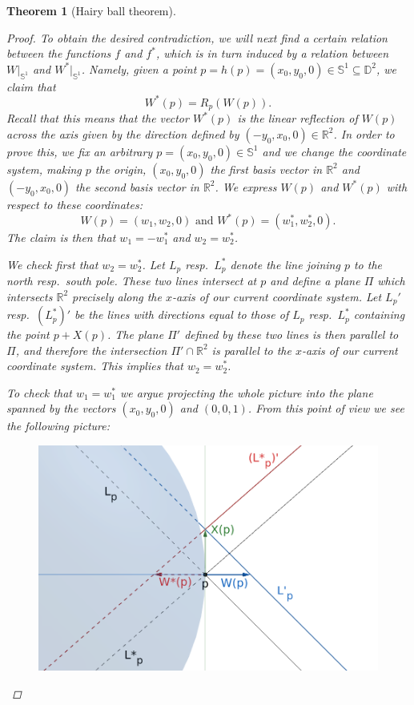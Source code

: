 \documentclass[A4paper, 12pt, british, reqno]{amsart}
\newcommand{\bbD}{\mathbb{D}}
\newcommand{\R}{\mathbb{R}} %
\newcommand{\bbS}{\mathbb{S}}
\theoremstyle{plain}
\newtheorem{thm}{Theorem}[section]
\theoremstyle{definition}
\theoremstyle{remark}
\theoremstyle{plain}
\theoremstyle{definition}
\theoremstyle{remark}
\theoremstyle{plain}
\theoremstyle{definition}
\theoremstyle{remark}
\begin{document}
\begin{thm}[Hairy ball theorem]
\begin{proof}
	To obtain the desired contradiction, we will next find a certain relation between the functions $f$ and $f^{*}$, which is in turn induced by a relation between $W|_{\bbS^{1}}$ and $W^{*}|_{\bbS^{1}}$.
	Namely, given a point $p=h(p)=(x_{0},y_{0},0)\in \bbS^{1}\subseteq \bbD^{2}$, we claim that
	\begin{equation}
	    W^{*}(p)=R_{p}(W(p)).
	\end{equation}
	Recall that this means that the vector $W^{*}(p)$ is the linear reflection of $W(p)$ across the axis given by the direction defined by $(-y_{0},x_{0},0)\in \R^{2}$.
	In order to prove this, we fix an arbitrary $p=(x_{0},y_{0},0)\in \bbS^{1}$ and we change the coordinate system, making $p$ the origin, $(x_{0},y_{0},0)$ the first basis vector in $\R^{2}$ and $(-y_{0},x_{0},0)$ the second basis vector in $\R^{2}$.
	We express $W(p)$ and $W^{*}(p)$ with respect to these coordinates:
	\[ W(p)=(w_{1},w_{2},0) \text{ and } W^{*}(p)=(w_{1}^{*},w_{2}^{*},0). \]
	The claim is then that $w_{1}=-w_{1}^{*}$ and $w_{2}=w_{2}^{*}$.

	We check first that $w_{2}=w_{2}^{*}$.
	Let $L_{p}$ resp.~$L_{p}^{*}$ denote the line joining $p$ to the north resp.~south pole.
	These two lines intersect at $p$ and define a plane $\Pi$ which intersects $\R^{2}$ precisely along the $x$-axis of our current coordinate system.
	Let $L_{p}'$ resp.~$(L_{p}^{*})'$ be the lines with directions equal to those of $L_{p}$ resp.~$L_{p}^{*}$ containing the point $p+X(p)$.
	The plane $\Pi'$ defined by these two lines is then parallel to $\Pi$, and therefore the intersection $\Pi'\cap \R^{2}$ is parallel to the $x$-axis of our current coordinate system.
	This implies that $w_{2}=w_{2}^{*}$.

	To check that $w_{1}=w_{1}^{*}$ we argue projecting the whole picture into the plane spanned by the vectors $(x_{0},y_{0},0)$ and $(0,0,1)$.
	From this point of view we see the following picture:
	
	\begin{figure}[htp]
	    \centering
	    \includegraphics[scale=.4]{HairyBall1.png}
	\end{figure}


\end{proof}
\end{thm}
\end{document}
